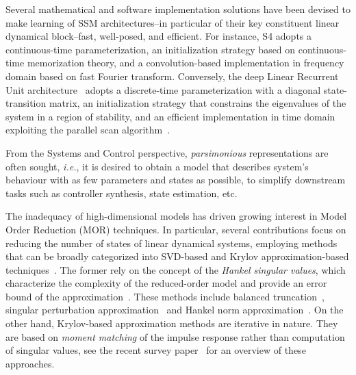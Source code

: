 \documentclass{article} %
\begin{document}
Several mathematical and software implementation solutions have been devised to make learning of SSM architectures--in particular of their key constituent linear dynamical block--fast, well-posed, and efficient. For instance, S4 \cite{Gu21} adopts a continuous-time parameterization, an initialization strategy based on continuous-time memorization theory, and a convolution-based implementation in frequency domain based on fast Fourier transform. Conversely, the deep Linear Recurrent Unit architecture~\cite{Orvieto23} adopts a discrete-time parameterization with a diagonal state-transition matrix, an initialization strategy that constrains the eigenvalues of the system in a region of stability, and an efficient implementation in time domain exploiting the parallel scan algorithm~\cite{blelloch1990prefix}.

From the Systems and Control perspective, \emph{parsimonious} representations are often sought, \emph{i.e.}, it is desired to obtain a model that describes system's behaviour with as few parameters and states as possible, to simplify downstream tasks such as controller synthesis, state estimation, etc. 

{The inadequacy of high-dimensional models has driven growing interest in Model Order Reduction (MOR) techniques. In particular, several contributions focus on reducing the number of states of linear dynamical systems, employing methods that can be broadly categorized into SVD-based and Krylov approximation-based techniques~\cite{ath05}.  The former rely on the concept of the \emph{Hankel singular values}, which characterize the complexity of the reduced-order model and provide an error bound of the approximation~\cite{glover84}. These methods include balanced truncation~\cite{alsaggaf88, moore81}, singular perturbation approximation~\cite{liu89spa} and  Hankel norm approximation~\cite{pillonetto2016}. On the other hand, Krylov-based approximation methods are iterative in nature. They are based on \emph{moment matching} of the impulse response rather than computation of singular values, see the recent survey paper~\cite{SCARCIOTTI2024moment} for an overview of these approaches. 
}
\end{document}
